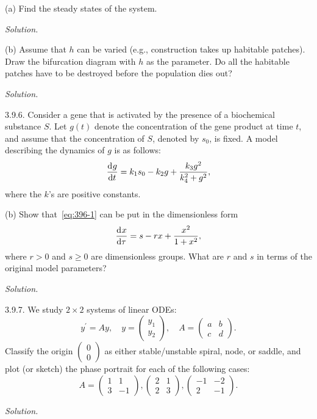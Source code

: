 \documentclass{article}
\begin{document}
(a) Find the steady states of the system.

\textit{Solution.}

\vspace{5mm}

(b) Assume that $h$ can be varied (e.g., construction takes up habitable
patches). Draw the bifurcation diagram with $h$ as the parameter. Do all
the habitable patches have to be destroyed before the population dies
out?

\textit{Solution.}

\newpage

3.9.6. Consider a gene that is activated by the presence of a
biochemical substance $S$. Let $g(t)$ denote the concentration of the
gene product at time $t$, and assume that the concentration of $S$,
denoted by $s_0$, is fixed. A model describing the dynamics of $g$
is as follows:
%
\begin{equation}
    \dod{g}{t} = k_1 s_0 - k_2 g + \frac{k_3 g^2}{k_4^2 + g^2}
    \label{eq:396-1}
    ,
\end{equation}
%
where the $k$'s are positive constants.

(b) Show that~\eqref{eq:396-1} can be put in the dimensionless form
%
\begin{equation*}
    \dod{x}{\tau} = s - r x + \frac{x^2}{1 + x^2}
    ,
\end{equation*}
%
where $r > 0$ and $s \geq 0$ are dimensionless groups. What are $r$ and
$s$ in terms of the original model parameters?

\textit{Solution.}

\newpage

3.9.7. We study $2 \times 2$ systems of linear ODEs:
%
\begin{equation*}
    y^\prime = A y, \quad
    y =
    \begin{pmatrix}
        y_1 \\
        y_2
    \end{pmatrix}, \quad
    A =
    \begin{pmatrix}
        a & b \\
        c & d
    \end{pmatrix}
    .
\end{equation*}
%
Classify the origin $\begin{pmatrix}0 \\ 0\end{pmatrix}$ as either
stable/unstable spiral, node, or saddle, and plot (or sketch) the
phase portrait for each of the following cases:
%
\begin{equation*}
    A =
    \begin{pmatrix}
        1 & 1 \\
        3 & -1
    \end{pmatrix}
    ,
    \begin{pmatrix}
        2 & 1 \\
        2 & 3
    \end{pmatrix}
    ,
    \begin{pmatrix}
        -1 & -2 \\
        2 & -1
    \end{pmatrix}
    .
\end{equation*}

\textit{Solution.}
\end{document}
